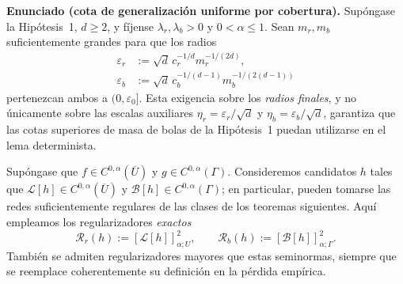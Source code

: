 \medskip
\noindent\textbf{Enunciado (cota de generalización uniforme por cobertura).}
Supóngase la Hipótesis~1, $d\geq2$, y fíjense $\lambda_r,\lambda_b>0$ y
$0<\alpha\leq1$. Sean $m_r,m_b$ suficientemente grandes para que los radios
\begin{equation}\label{eq:thm1_radii}
\begin{aligned}
\varepsilon_r&:=\sqrt d\,c_r^{-1/d}m_r^{-1/(2d)},\\
\varepsilon_b&:=\sqrt d\,c_b^{-1/(d-1)}m_b^{-1/(2(d-1))}
\end{aligned}
\end{equation}
pertenezcan ambos a $(0,\varepsilon_0]$. Esta exigencia sobre los
\emph{radios finales}, y no únicamente sobre las escalas auxiliares
$\eta_r=\varepsilon_r/\sqrt d$ y $\eta_b=\varepsilon_b/\sqrt d$,
garantiza que las cotas superiores de masa de bolas de la Hipótesis~1
puedan utilizarse en el lema determinista.

Supóngase que $f\in C^{0,\alpha}(\overline U)$ y
$g\in C^{0,\alpha}(\Gamma)$. Consideremos candidatos $h$ tales que
$\mathcal L[h]\in C^{0,\alpha}(\overline U)$ y
$\mathcal B[h]\in C^{0,\alpha}(\Gamma)$; en particular, pueden tomarse
las redes suficientemente regulares de las clases de los teoremas
siguientes. Aquí empleamos los regularizadores \emph{exactos}
\[
\mathcal R_r(h):=[\mathcal L[h]]_{\alpha;U}^{2},\qquad
\mathcal R_b(h):=[\mathcal B[h]]_{\alpha;\Gamma}^{2}.
\]
También se admiten regularizadores mayores que estas seminormas, siempre
que se reemplace coherentemente su definición en la pérdida empírica.

